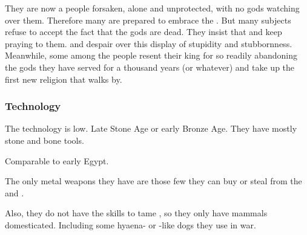 
They are now a people forsaken, alone and unprotected, with no gods watching over them. 
Therefore many are prepared to embrace the \banes. 
But many subjects refuse to accept the fact that the gods are dead. 
They insist that  and keep praying to them. 
\Semiza{} and \Eshayzal{} despair over this display of stupidity and stubbornness. 
Meanwhile, some among the people resent their king for so readily abandoning the gods they have served for a thousand years (or whatever) and take up the first new religion that walks by. 





\subsubsection{Technology}
The technology is low. 
Late Stone Age or early Bronze Age. 
They have mostly stone and bone tools. 

Comparable to early Egypt. 

The only metal weapons they have are those few they can buy or steal from the \scathae{} and \cregorrs. 

Also, they do not have the skills to tame \saurians{}, so they only have mammals domesticated. 
Including some hyaena- or -like dogs they use in war. 





